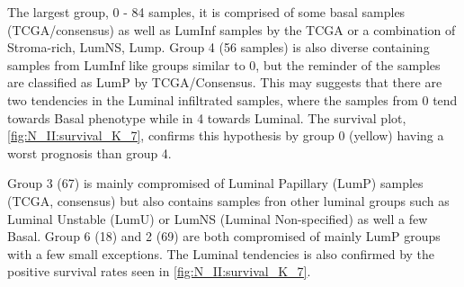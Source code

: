 The largest group, 0 - 84 samples, it is comprised of some basal samples (TCGA/consensus) as well as LumInf samples by the TCGA or a combination of Stroma-rich, LumNS, Lump. Group 4 (56 samples) is also diverse containing samples from LumInf like groups similar to 0, but the reminder of the samples are classified as LumP by TCGA/Consensus. This may suggests that there are two tendencies in the Luminal infiltrated samples, where the samples from 0 tend towards Basal phenotype while in 4 towards Luminal. The survival plot, \cref{fig:N_II:survival_K_7}, confirms this hypothesis by group 0 (yellow) having a worst prognosis than group 4.

Group 3 (67) is mainly compromised of Luminal Papillary (LumP) samples (TCGA, consensus) but also contains samples fron other luminal groups such as Luminal Unstable (LumU) or LumNS (Luminal Non-specified) as well a few Basal. Group 6 (18) and 2 (69) are both compromised of mainly LumP groups with a few small exceptions. The Luminal tendencies is also confirmed by the positive survival rates seen in \cref{fig:N_II:survival_K_7}.

